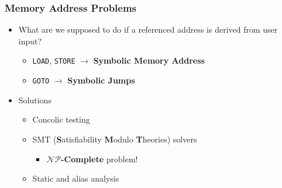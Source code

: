 \begin{frame}
	\frametitle{Memory Address Problems}
	\begin{itemize}
		\item What are we supposed to do if a referenced address is derived from user input?
		\begin{itemize}
			\item \texttt{LOAD}, \texttt{STORE} $\rightarrow$ \textbf{Symbolic Memory Address}
			\item \texttt{GOTO} $\rightarrow$ \textbf{Symbolic Jumps}
		\end{itemize}
		\item Solutions
		\begin{itemize}
			\item Concolic testing
			\item SMT (\textbf{S}atisfiability \textbf{M}odulo \textbf{T}heories) solvers
			\begin{itemize}
				\item $\mathcal{NP}$\textbf{-Complete} problem!
			\end{itemize}
			\item Static and alias analysis
		\end{itemize}
	\end{itemize}
\end{frame}